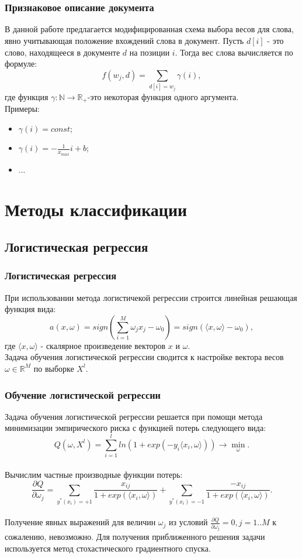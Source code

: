 \documentclass{beamer}
\begin{document}
\section{}
\begin{frame}
\frametitle{Признаковое описание документа}
В данной работе предлагается модифицированная схема выбора весов для слова, явно учитывающая положение вхождений слова в документ. Пусть $d[i]$ - это слово, находящееся в документе $d$ на позиции $i$. Тогда вес слова вычисляется по формуле:
$$f(w_j,d)=\sum\limits_{d[i]=w_j}\gamma(i),$$
где функция $\gamma:\mathbb{N}\rightarrow\mathbb{R}_+$-это некоторая функция одного аргумента.\\
Примеры:
\begin{itemize}
	\item{$\gamma(i)=const;$}
	\item{$\gamma(i)=-\frac{1}{x_{max}}i+b$;}
	\item{...}
\end{itemize}
\end{frame}


\section{Методы классификации}
\subsection{Логистическая регрессия}
\begin{frame}
\end{frame}

\begin{frame}
\frametitle{Логистическая регрессия}
При использовании метода логистичекой регрессии строится линейная решающая функция вида:
$$a(x,\omega)=sign\left(\sum\limits_{i=1}^M\omega_j x_j-\omega_0\right)=sign\left(\langle x,\omega \rangle-\omega_0 \right),$$ где $\langle x,\omega \rangle$ - скалярное произведение векторов $x$ и $\omega$.
\newline
\\Задача обучения логистической регрессии сводится к настройке вектора весов $\omega\in \mathbb{R}^M$ по выборке $X^l$.
\end{frame}

\begin{frame}
\frametitle{Обучение логистической регрессии}
Задача обучения логистической регрессии решается при помощи метода минимизации эмпирического риска с функцией потерь следующего вида:
$$Q(\omega, X^l)=\sum\limits_{i=1}^l ln(1+exp(-y_i\langle x_i,\omega \rangle))\rightarrow \min\limits_{\omega}.$$
\\Вычислим частные производные функции потерь:
$$\frac{\partial Q}{\partial \omega_j}=\sum\limits_{y^*(x_i)=+1}\frac{x_{ij}}{1+exp(\langle x_i,\omega\rangle)}+\sum\limits_{y^*(x_i)=-1}\frac{-x_{ij}}{1+exp(\langle x_i,\omega\rangle)}.$$
\\Получение явных выражений для величин $\omega_j$ из условий $\frac{\partial Q}{\partial \omega_j}=0, j=1..M$ к сожалению, невозможно. Для получения приближенного решения задачи используется метод стохастического градиентного спуска.
\end{frame}
\end{document}
